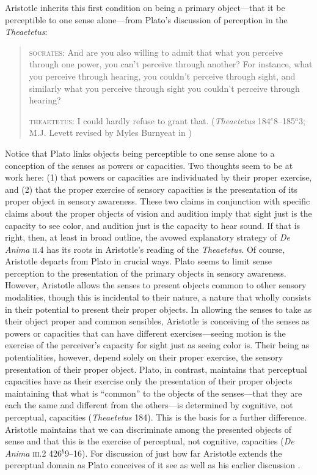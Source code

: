 Aristotle inherits this first condition on being a primary object---that it be perceptible to one sense alone---from Plato's discussion of perception in the \emph{Theaetetus}:
\begin{quotation}
	\textsc{socrates}: And are you also willing to admit that what you perceive through one power, you can't perceive through another? For instance, what you perceive through hearing, you couldn't perceive through sight, and similarly what you perceive through sight you couldn't perceive through hearing?
	
	\textsc{theaetetus}: I could hardly refuse to grant that. (\emph{Theaetetus} 184\( ^{e} \)8--185\( ^{a} \)3; M.J. Levett revised by Myles Burnyeat in \citealt[204]{Cooper:1997fk})
\end{quotation}
Notice that Plato links objects being perceptible to one sense alone to a conception of the senses as powers or capacities. Two thoughts seem to be at work here: (1) that powers or capacities are individuated by their proper exercise, and (2) that the proper exercise of sensory capacities is the presentation of its proper object in sensory awareness. These two claims in conjunction with specific claims about the proper objects of vision and audition imply that sight just is the capacity to see color, and audition just is the capacity to hear sound. If that is right, then, at least in broad outline, the avowed explanatory strategy of \emph{De Anima} \textsc{ii}.4 has its roots in Aristotle's reading of the \emph{Theaetetus}. Of course, Aristotle departs from Plato in crucial ways. Plato seems to limit sense perception to the presentation of the primary objects in sensory awareness. However, Aristotle allows the senses to present objects common to other sensory modalities, though this is incidental to their nature, a nature that wholly consists in their potential to present their proper objects. In allowing the senses to take as their object proper and common sensibles, Aristotle is conceiving of the senses as powers or capacities that can have different exercises---seeing motion is the exercise of the perceiver's capacity for sight just as seeing color is. Their being as potentialities, however, depend solely on their proper exercise, the sensory presentation of their proper object. Plato, in contrast, maintains that perceptual capacities have as their exercise only the presentation of their proper objects maintaining that what is ``common'' to the objects of the senses---that they are each the same and different from the others---is determined by cognitive, not perceptual, capacities (\emph{Theaetetus} 184). This is the basis for a further difference. Aristotle maintains that we can discriminate among the presented objects of sense and that this is the exercise of perceptual, not cognitive, capacities (\emph{De Anima} \textsc{iii}.2 426\( ^{b} \)9--16). For discussion of just how far Aristotle extends the perceptual domain as Plato conceives of it see \citealt{Sorabji:2003fk} as well as his earlier discussion \citealt{Sorabji:1971fr}.


